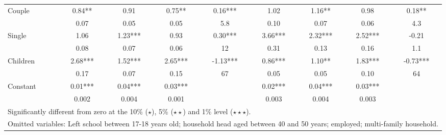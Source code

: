 \begin{table}
\begin{tabular}{l|cccc|cccc}
Couple	&	       0.84**	&	      0.91	&	     0.75**	&	0.16***	
		&	       1.02	&	       1.16**	&	      0.98	&	0.18**	\\
		&	       0.07   	&	0.05	&	0.05	&	5.8	
		&	       0.10   	&	0.07	&	0.06	&	4.3	\\
Single	&	       1.06	&	       1.23*** 	&	   0.93	&	0.30***	
		&	       3.66***	&	     2.32***	&	       2.52***	&	-0.21	\\
		&	       0.08   	&	0.07	&	0.06	&	12	
		&	       0.31   	&	0.13	&	0.16	&	1.1	\\
Children	&	       2.68***	&	     1.52***	&	      2.65***	&	-1.13***	
		&	       0.86***	&	      1.10**	&	       1.83***	&	-0.73***	\\
		&	       0.17   	&	0.07	&	0.15	& 67	
		&	       0.05   	&	0.05	&	0.10	& 64	\\
Constant            	&	       0.01***	&	       0.04***	&	       0.03***	&		&	       0.02***	&	       0.04***	&	       0.03***	&		\\
                    	&	       0.002   	&	0.004	&	0.001 	&		&	       0.003   	&	0.004	&	0.003	&		\\
\hline\hline
\multicolumn{9}{l}{Significantly different from zero at the 10\% ($\star$), 5\% ($\star\star$) and 1\% level ($\star\star\star$).} \\
\multicolumn{9}{l}{Omitted variables: Left school between 17-18 years old; household head aged between 40 and 50 years; employed; multi-family household.}
\end{tabular}
\label{table:interact}
\end{table}




